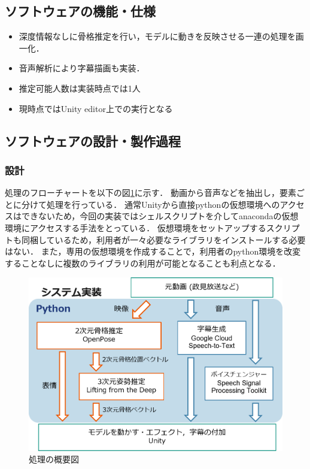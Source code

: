\documentclass[a4paper,12pt]{jsarticle}
\begin{document}
\subsection{ソフトウェアの機能・仕様}
\begin{itemize}
  \item 深度情報なしに骨格推定を行い，モデルに動きを反映させる一連の処理を画一化．
  \item 音声解析により字幕描画も実装．
  \item 推定可能人数は実装時点では1人
  \item 現時点ではUnity editor上での実行となる

\end{itemize}

\subsection{ソフトウェアの設計・製作過程}
\subsubsection{設計}
処理のフローチャートを以下の図\ref{fig:iw1311}に示す．
動画から音声などを抽出し，要素ごとに分けて処理を行っている．
通常Unityから直接pythonの仮想環境へのアクセスはできないため，今回の実装ではシェルスクリプトを介してanacondaの仮想環境にアクセスする手法をとっている．
仮想環境をセットアップするスクリプトも同梱しているため，利用者が一々必要なライブラリをインストールする必要はない．
また，専用の仮想環境を作成することで，利用者のpython環境を改変することなしに複数のライブラリの利用が可能となることも利点となる．
\begin{figure}[h]
  \centering
  \includegraphics[width=1.0\textwidth]{fig/iw1311.png}
  \caption{処理の概要図}
  \label{fig:iw1311}
\end{figure}
\end{document}
